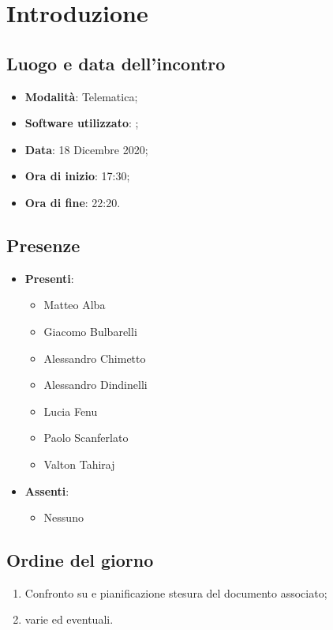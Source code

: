 \documentclass[]{article}
\begin{document}
	
	
	
	\newpage
	
	\section{Introduzione}
		\subsection{Luogo e data dell'incontro}
		\begin{itemize}
			\item \textbf{Modalità}: Telematica;
			\item \textbf{Software utilizzato}: ;
			\item \textbf{Data}: 18 Dicembre 2020;
			\item \textbf{Ora di inizio}: 17:30;
			\item \textbf{Ora di fine}: 22:20.
		\end{itemize}

		\subsection{Presenze}
		\begin{itemize}
			\item \textbf{Presenti}:
			\begin{itemize}
				\item Matteo Alba
				\item Giacomo Bulbarelli
				\item Alessandro Chimetto
				\item Alessandro Dindinelli
				\item Lucia Fenu
				\item Paolo Scanferlato
				\item Valton Tahiraj
			\end{itemize}
			\item \textbf{Assenti}:
			\begin{itemize}
				\item Nessuno
			\end{itemize}
		\end{itemize}


		\subsection{Ordine del giorno}
		\begin{enumerate}
			\item Confronto su  e pianificazione stesura del documento associato;
			\item varie ed eventuali.
		\end{enumerate}
\end{document}
